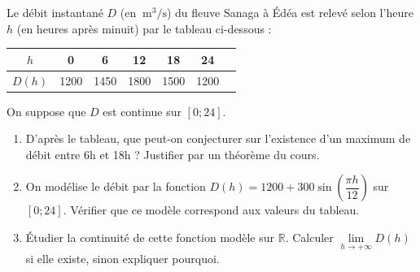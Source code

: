 \documentclass[11pt]{article}
\begin{document}
\begin{exercice}
Le débit instantané $D$ (en $\SI{}{\meter\cubed\per\second}$) du fleuve Sanaga à Édéa est relevé selon l'heure $h$ (en heures après minuit) par le tableau ci-dessous :
\begin{center}
\begin{tabular}{|c|c|c|c|c|c|c|}
\hline
$h$ & 0 & 6 & 12 & 18 & 24 \\ \hline
$D(h)$ & 1200 & 1450 & 1800 & 1500 & 1200 \\ \hline
\end{tabular}
\end{center}
On suppose que $D$ est continue sur $[0; 24]$.
\begin{enumerate}
    \item D'après le tableau, que peut-on conjecturer sur l'existence d'un maximum de débit entre 6h et 18h ? Justifier par un théorème du cours.
    \item On modélise le débit par la fonction $D(h) = 1200 + 300\sin\left(\dfrac{\pi h}{12}\right)$ sur $[0; 24]$. Vérifier que ce modèle correspond aux valeurs du tableau.
    \item Étudier la continuité de cette fonction modèle sur $\mathbb{R}$. Calculer $\lim\limits_{h \to +\infty} D(h)$ si elle existe, sinon expliquer pourquoi.
\end{enumerate}
\end{exercice}
\end{document}
